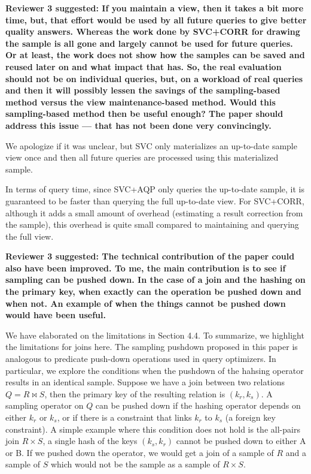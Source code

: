 \vspace{1.5em}

\textbf{Reviewer 3 suggested:  If you maintain a view, then it takes a bit more time, but, that effort would be used by all future queries to give better quality answers. Whereas the work done by SVC+CORR for drawing the sample is all gone and largely cannot be used for future queries. Or at least, the work does not show how the samples can be saved and reused later on and what impact that has. So, the real evaluation should not be on individual queries, but, on a workload of real queries and then it will possibly lessen the savings of the sampling-based method versus the view maintenance-based method. Would this sampling-based method then be useful enough? The paper should address this issue --- that has not been done very convincingly.}

We apologize if it was unclear, but SVC only materializes an up-to-date sample view once and then all future queries are processed using this materialized sample.

In terms of query time, since SVC+AQP only queries the up-to-date sample, it is guaranteed to be faster than querying the full up-to-date view. For SVC+CORR, although it adds a small amount of overhead (estimating a result correction from the sample), this overhead is quite small compared to maintaining and querying the full view. 

\vspace{1.5em}

\textbf{Reviewer 3 suggested: The technical contribution of the paper could also have been improved. To me, the main contribution is to see if sampling can be pushed down. In the case of a join and the hashing on the primary key, when exactly can the operation be pushed down and when not. An example of when the things cannot be pushed down would have been useful. }

We have elaborated on the limitations in Section 4.4.
To summarize, we highlight the limitations for joins here.
The sampling pushdown proposed in this paper is analogous to predicate push-down operations used in query optimizers. 
In particular, we explore the conditions when the pushdown of the hahsing operator results in an identical sample.
Suppose we have a join between two relations $Q = R \bowtie S$, then the primary key of the resulting relation is $(k_r, k_s)$.
A sampling operator on $Q$ can be pushed down if the hashing operator depends on either $k_r$ or $k_s$, or if there is a constraint that links $k_r$ to $k_s$ (a foreign key constraint).
A simple example where this condition does not hold is the all-pairs join $R \times S$, a single hash of the keys $(k_s, k_r)$ cannot be pushed down to either A or B. 
If we pushed down the operator, we would get a join of a sample of $R$ and a sample of $S$ which would not be the sample as a sample of $R \times S$.

